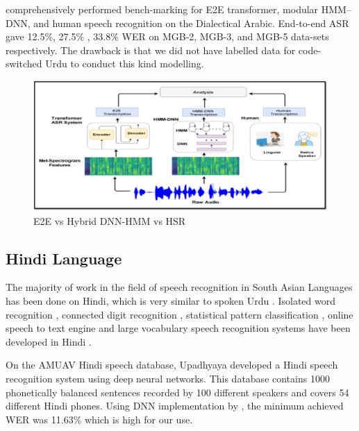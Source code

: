 \cite{hussein_arabic_2022} comprehensively performed  bench-marking for E2E transformer, modular HMM–DNN, and human speech recognition on the Dialectical Arabic. End-to-end ASR gave 12.5\%, 27.5\% , 33.8\% WER on MGB-2, MGB-3, and MGB-5 data-sets respectively. The drawback is that we did not have labelled data for code-switched Urdu to conduct this kind modelling. %

\begin{figure}[h!]
    \centering
    \includegraphics[scale=0.40]{img/ASR-diagram-comparison.png}
    \caption{E2E vs Hybrid DNN-HMM vs HSR \cite{hussein_arabic_2022}}
    \label{fig:hybrid-vs-e2e-HSR}
\end{figure}

\subsection{Hindi Language}
The majority of work in the field of speech recognition in South Asian Languages has been done on Hindi, which is very similar to spoken Urdu \cite{farooq_improving_2019} \cite{dash_automatic_2018}. Isolated word recognition \cite{patil_automatic_2016}, connected digit recognition \cite{a_n_mishra_robust_2011}, statistical pattern classification \cite{aggarwal_using_2011}, online speech to text engine \cite{b_venkataraman_sopc-based_2006} and large vocabulary speech recognition systems have been developed in Hindi \cite{kumar_large-vocabulary_2004}. 

On the AMUAV Hindi speech database, Upadhyaya \cite{tanveer_continuous_2019} developed a Hindi speech recognition system using deep neural networks. This database contains 1000 phonetically balanced sentences recorded by 100 different speakers and covers 54 different Hindi phones. Using DNN implementation by \cite{karel_vesel_sequence-discriminative_2013}, the minimum achieved WER was 11.63\% which is high for our use.

